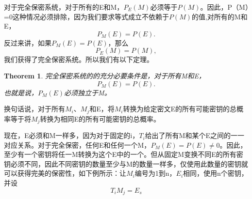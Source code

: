 \documentclass[]{article}
\newtheorem{theorem}{Theorem}
\begin{document}
对于完全保密系统，对于所有的E和M，$P_E(M)$必须等于$P(M)$。因此，P（M）=0这种情况必须排除，因为我们要求等式成立不依赖于$P(M)$的值,对所有的M和E，
\[P_M(E)=P(E).\]
反过来讲，如果$P_M(E)=P(E)$，那么
\[P_E(M)=P(M),\]
我们获得了完全保密系统。所以我们有以下定理。

\begin{theorem}
	完全保密系统的的充分必要条件是，对于所有M和E，
	\[P_M(E)=P(E).\]
	也就是说，$P_M(E)$必须独立于M。
\end{theorem}

换句话说，对于所有$M_i$、$M_j$和E，将$M_i$转换为给定密文E的所有可能密钥的总概率等于将$M_j$转换为相同E的所有可能密钥的总概率。

现在，E必须和M一样多，因为对于固定的i，$T_i$给出了所有M和某个E之间的一一对应关系。对于完全保密，任何E和任何一个M，$P_M(E)=P(E)\neq 0$。因此，至少有一个密钥将任一M转换为这个E中的一个。但从固定M变换不同E的所有密钥必须不同，因此不同密钥的数量至少与M的数量一样多，仅使用此数量的密钥就可以获得完美的保密性，如下例所示：让$M_i$编号为1到n，$E_i$相同，使用n个密钥，并设
\[T_i M_j=E_s\]
\end{document}
